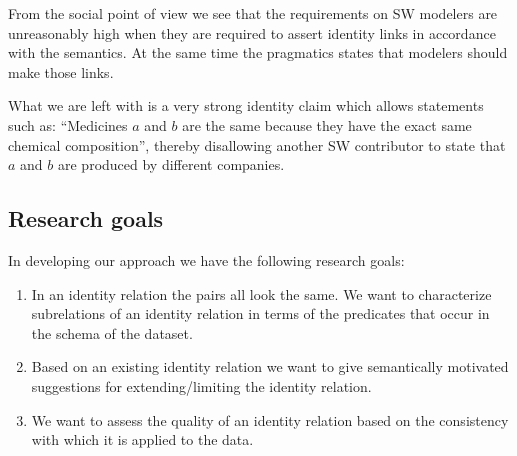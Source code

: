 From the social point of view
we see that the requirements on SW modelers
are unreasonably high when they are required to
assert identity links in accordance with the semantics.
At the same time the pragmatics states that modelers should
make those links.



What we are left with is a very strong identity claim
which allows statements such as:
``Medicines $a$ and $b$ are the same because they have the exact same
  chemical composition'',
thereby disallowing another SW contributor to state that
$a$ and $b$ are produced by different companies.

\subsection{Research goals}
\label{sec:research_goals}

In developing our approach we have the following research goals:
\begin{enumerate}
\item In an identity relation the pairs all look the same.
      We want to characterize subrelations of an identity relation in terms
      of the predicates that occur in the schema of the dataset.
\item Based on an existing identity relation we want to give semantically
      motivated suggestions for extending/limiting the identity relation.
\item We want to assess the quality of an identity relation based on
      the consistency with which it is applied to the data.
\end{enumerate}
